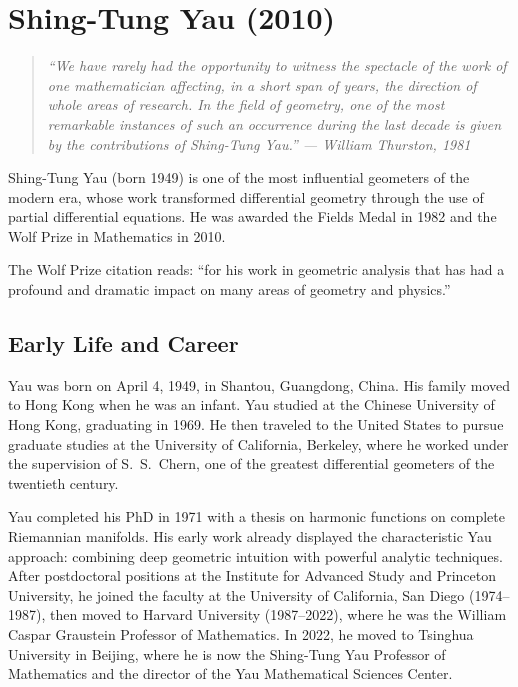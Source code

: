 \providecommand{\Hol}{\operatorname{Hol}}

\chapter{Shing-Tung Yau (2010)}

\begin{quote}
\it ``We have rarely had the opportunity to witness the spectacle of the work of one mathematician affecting, in a short span of years, the direction of whole areas of research. In the field of geometry, one of the most remarkable instances of such an occurrence during the last decade is given by the contributions of Shing-Tung Yau.'' --- William Thurston, 1981
\end{quote}

Shing-Tung Yau (born 1949) is one of the most influential geometers of the modern era, whose work transformed differential geometry through the use of partial differential equations. He was awarded the Fields Medal in 1982 and the Wolf Prize in Mathematics in 2010.

The Wolf Prize citation reads: ``for his work in geometric analysis that has had a profound and dramatic impact on many areas of geometry and physics.''

\section{Early Life and Career}

Yau was born on April 4, 1949, in Shantou, Guangdong, China. His family moved to Hong Kong when he was an infant. Yau studied at the Chinese University of Hong Kong, graduating in 1969. He then traveled to the United States to pursue graduate studies at the University of California, Berkeley, where he worked under the supervision of S.\ S.\ Chern, one of the greatest differential geometers of the twentieth century.

Yau completed his PhD in 1971 with a thesis on harmonic functions on complete Riemannian manifolds. His early work already displayed the characteristic Yau approach: combining deep geometric intuition with powerful analytic techniques. After postdoctoral positions at the Institute for Advanced Study and Princeton University, he joined the faculty at the University of California, San Diego (1974--1987), then moved to Harvard University (1987--2022), where he was the William Caspar Graustein Professor of Mathematics. In 2022, he moved to Tsinghua University in Beijing, where he is now the Shing-Tung Yau Professor of Mathematics and the director of the Yau Mathematical Sciences Center.

